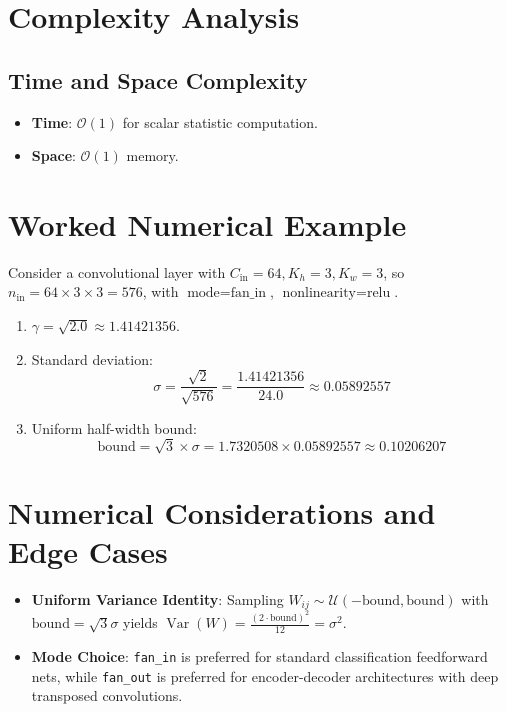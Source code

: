\documentclass[11pt,a4paper]{article}
\theoremstyle{definition}
\begin{document}
\section{Complexity Analysis}

\subsection{Time and Space Complexity}
\begin{itemize}
    \item \textbf{Time}: $\mathcal{O}(1)$ for scalar statistic computation.
    \item \textbf{Space}: $\mathcal{O}(1)$ memory.
\end{itemize}

\section{Worked Numerical Example}

Consider a convolutional layer with $C_{\text{in}} = 64, K_h = 3, K_w = 3$, so $n_{\text{in}} = 64 \times 3 \times 3 = 576$, with $\text{mode} = \text{fan\_in}$, $\text{nonlinearity} = \text{relu}$.

\begin{enumerate}
    \item $\gamma = \sqrt{2.0} \approx 1.41421356$.
    \item Standard deviation:
    \begin{equation}
    \sigma = \frac{\sqrt{2}}{\sqrt{576}} = \frac{1.41421356}{24.0} \approx 0.05892557
    \end{equation}
    \item Uniform half-width bound:
    \begin{equation}
    \text{bound} = \sqrt{3} \times \sigma = 1.7320508 \times 0.05892557 \approx 0.10206207
    \end{equation}
\end{enumerate}

\section{Numerical Considerations and Edge Cases}

\begin{itemize}
    \item \textbf{Uniform Variance Identity}: Sampling $W_{ij} \sim \mathcal{U}(-\text{bound}, \text{bound})$ with $\text{bound} = \sqrt{3} \sigma$ yields $\operatorname{Var}(W) = \frac{(2 \cdot \text{bound})^2}{12} = \sigma^2$.
    \item \textbf{Mode Choice}: \texttt{fan\_in} is preferred for standard classification feedforward nets, while \texttt{fan\_out} is preferred for encoder-decoder architectures with deep transposed convolutions.
\end{itemize}
\end{document}
